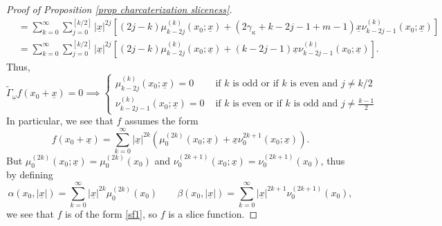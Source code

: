 \documentclass{amsart}
\theoremstyle{definition}
\theoremstyle{remark}
\numberwithin{equation}{section}
\begin{document}
\begin{proof}[Proof of Proposition \ref{prop charcaterization sliceness}]
{\begin{equation*}
\begin{split}
     &=\sum_{k=0}^{\infty}\sum_{j=0}^{[k/2]}|\underline{x}|^{2j}\left[(2j-k)\mu^{(k)}_{k-2j}(x_0;\underline x)+(2\gamma_\kappa+k-2j-1+m-1)\underline x\nu^{(k)}_{k-2j-1}(x_0;\underline x)\right]\\
     &=\sum_{k=0}^{\infty}\sum_{j=0}^{[k/2]}|\underline{x}|^{2j}\left[(2j-k)\mu^{(k)}_{k-2j}(x_0;\underline x)+(k-2j-1)\underline x\nu^{(k)}_{k-2j-1}(x_0;\underline x)\right].
     \end{split}
     \end{equation*}
     Thus,
    \begin{equation*}
       \widetilde{\Gamma}_{\underline\omega}f(x_{0}+\underline x)=0 \implies \left\{\begin{array}{ll}
       \mu^{(k)}_{k-2j}(x_0;\underline{x})=0&\text{ if }k\text{ is odd or if }k \text{ is even and } j\neq k/2\\
        \nu^{(k)}_{k-2j-1}(x_0;\underline{x})=0&\text{ if }k\text{ is even or if }k \text{ is odd and } j\neq \frac{k-1}{2}
       \end{array}
       \right.
    \end{equation*}
    In particular, we see that $f$ assumes the form
    \begin{equation*}
    f(x_0+\underline x)=\sum_{k=0}^\infty|\underline x|^{2k}\left(\mu_0^{(2k)}(x_0;\underline{x})+\underline{x}\nu_0^{2k+1}(x_0;\underline{x})\right).
    \end{equation*}
    But $\mu_0^{(2k)}(x_0;\underline x)=\mu_0^{(2k)}(x_0)$ and $\nu_0^{(2k+1)}(x_0;\underline x)=\nu_0^{(2k+1)}(x_0)$, thus by defining
    \begin{equation*}
    \alpha(x_0,|\underline{x}|)=\sum_{k=0}^\infty|\underline x|^{2k}\mu_0^{(2k)}(x_0)\qquad\beta(x_0,|\underline x|)=\sum_{k=0}^\infty|\underline x|^{2k+1}\nu_0^{(2k+1)}(x_0),
    \end{equation*}}
    we see that $f$ is of the form \eqref{sf1}, so $f$ is a slice function.

\end{proof}
\end{document}
